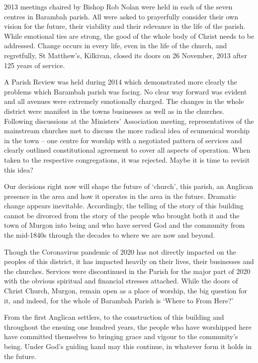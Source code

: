 2013 meetings chaired by Bishop Rob Nolan were held in each of the seven centres in Barambah parish. All were asked to prayerfully consider their own vision for the future, their viability and their relevance in the life of the parish. While emotional ties are strong, the good of the whole body of Christ needs to be addressed. Change occurs in every life, even in the life of the church, and regretfully, St Matthew's, Kilkivan, closed its doors on 26 November, 2013 after 125 years of service.



A Parish Review was held during 2014 which demonstrated more clearly the problems which Barambah parish was facing. No clear way forward was evident and all avenues were extremely emotionally charged. The changes in the whole district were manifest in the towns businesses as well as in the churches. Following discussions at the Ministers' Association meeting, representatives of the mainstream churches met to discuss the more radical idea of ecumenical worship in the town -- one centre for worship with a negotiated pattern of services and clearly outlined constitutional agreement to cover all aspects of operation. When taken to the respective congregations, it was rejected. Maybe it is time to revisit this idea?



Our decisions right now will shape the future of `church', this parish, an Anglican presence in the area and how it operates in the area in the future. Dramatic change appears inevitable. Accordingly, the telling of the story of this building cannot be divorced from the story of the people who brought both it and the town of Murgon into being and who have served God and the community from the mid-1840s through the decades to where we are now and beyond.



Though the Coronavirus pandemic of 2020 has not directly impacted on the peoples of this district, it has impacted heavily on their lives, their businesses and the churches. Services were discontinued in the Parish for the major part of 2020 with the obvious spiritual and financial stresses attached. While the doors of Christ Church, Murgon, remain open as a place of worship, the big question for it, and indeed, for the whole of Barambah Parish is `Where to From Here?'



From the first Anglican settlers, to the construction of this building and throughout the ensuing one hundred years, the people who have worshipped here have committed themselves to bringing grace and vigour to the community's being. Under God's guiding hand may this continue, in whatever form it holds in the future.

